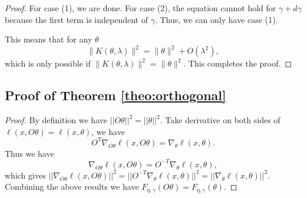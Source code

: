 \documentclass{article}
\theoremstyle{plain}
\begin{document}
\begin{proof}
For case (1), we are done. For case (2), the equation cannot hold for $\gamma + d \gamma$ because the first term is independent of $\gamma$. Thus, we can only have case (1).

This means that for any $\theta$
\begin{equation}
    \| K(\theta, \lambda) \|^2 = \|\theta\|^2 + O(\lambda^2),
\end{equation}
which is only possible if $\| K(\theta, \lambda) \|^2 = \|\theta\|^2$. This completes the proof.
\end{proof}

\subsection{Proof of Theorem \ref{theo:orthogonal}}
\begin{proof}
By definition we have $||O\theta||^2=||\theta||^2$. Take derivative on both sides of $\ell(x,O\theta)=\ell(x,\theta)$, we have
\begin{equation}
O^T\nabla_{O\theta}\ell(x,O\theta)=\nabla_\theta\ell(x,\theta).
\end{equation}
Thus we have
\begin{equation}
\nabla_{O\theta}\ell(x,O\theta)=O^{-T}\nabla_\theta\ell(x,\theta),
\end{equation}
which gives $||\nabla_{O\theta}\ell(x,O\theta)||^2=||O^{-T}\nabla_\theta\ell(x,\theta)||^2=||\nabla_\theta\ell(x,\theta)||^2$. Combining the above results we have $F_{\eta,\gamma}(O\theta)=F_{\eta,\gamma}(\theta)$.
\end{proof}
\end{document}
